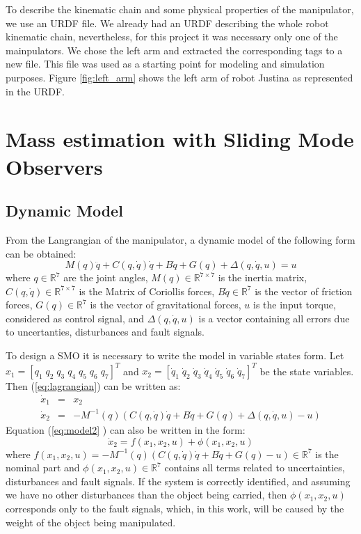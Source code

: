 \documentclass[a4paper, 10pt]{article}
\begin{document}
To describe the kinematic chain and some physical properties of the manipulator, we use an URDF file. We already had an URDF describing the whole robot kinematic chain, nevertheless, for this project it was necessary only one of the mainpulators. We chose the left arm and extracted the corresponding tags to a new file. This file was used as a starting point for modeling and simulation purposes. Figure \ref{fig:left_arm} shows the left arm of robot Justina as represented in the URDF.

\section{Mass estimation with Sliding Mode Observers}
\label{sec:estimation}

\subsection{Dynamic Model}
  From the Langrangian of the manipulator, a dynamic model of the following form can be obtained:
  \begin{equation}
    M(q)\ddot{q} + C(q, \dot{q})\dot{q} + B\dot{q} + G(q) + \Delta(q,\dot{q}, u) = u
    \label{eq:lagrangian}
  \end{equation}
  where $q\in \mathbb{R}^7$ are the joint angles, $M(q)\in \mathbb{R}^{7\times 7}$ is the inertia matrix, $C(q,\dot{q})\in \mathbb{R}^{7\times 7}$ is the Matrix of Coriollis forces, $B\dot{q}\in \mathbb{R}^7$ is the vector of friction forces, $G(q)\in\mathbb{R}^7$ is the vector of gravitational forces, $u$ is the input torque, considered as control signal, and $\Delta(q,\dot{q},u)$ is a vector containing all errors due to uncertanties, disturbances and fault signals.
  
  To design a SMO it is necessary to write the model in variable states form. Let $x_1 = [q_1\;q_2\;q_3\;q_4\;q_5\;q_6\;q_7]^T$ and $x_2 = [\dot{q}_1\;\dot{q}_2\;\dot{q}_3\;\dot{q}_4\;\dot{q}_5\;\dot{q}_6\;\dot{q}_7]^T$ be the state variables. Then (\ref{eq:lagrangian}) can be written as:
  \begin{eqnarray}
    \dot{x}_1 &=& x_2\label{eq:model1}\\
    \dot{x}_2 &=& -M^{-1}(q)\left(C(q, \dot{q})\dot{q} + B\dot{q} + G(q) + \Delta(q,\dot{q},u) - u\right)\label{eq:model2}
  \end{eqnarray}
Equation (\ref{eq:model2} ) can also be written in the form:
  \begin{equation*}
    \dot{x}_2 = f(x_1, x_2, u) + \phi(x_1, x_2, u)
  \end{equation*}
  where $f(x_1, x_2, u) = -M^{-1}(q)\left(C(q, \dot{q})\dot{q} + B\dot{q} + G(q) - u\right) \in \mathbb{R}^7$ is the nominal part and $\phi(x_1, x_2, u) \in \mathbb{R}^7$ contains all terms related to uncertainties, disturbances and fault signals. If the system is correctly identified, and assuming we have no other disturbances than the object being carried, then $\phi(x_1, x_2, u)$ corresponds only to the fault signals, which, in this work, will be caused by the weight of the object being manipulated.
\end{document}
